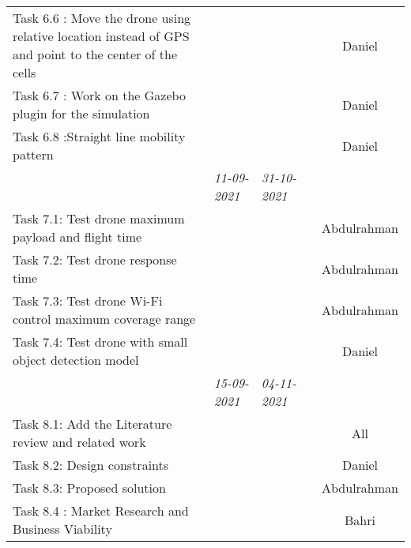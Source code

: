 \begin{center}
\begin{small}
\begin{xltabular}{\textwidth}{ p{3cm} p{5cm} X X c }
            Task 6.6 : Move the drone using relative location instead of GPS and point to the center of the cells
                & & & & Daniel \\

            Task 6.7 : Work on the Gazebo plugin for the simulation
                & & & & Daniel \\

            Task 6.8 :Straight line mobility pattern
                & & & & Daniel \\

            \addlinespace
                & \emph{11-09-2021} & \emph{31-10-2021} & 
            \\ \addlinespace

            Task 7.1: Test drone maximum payload and flight time 
                & & & & Abdulrahman \\

            Task 7.2: Test drone response time
                & & & & Abdulrahman \\

            Task 7.3: Test drone Wi-Fi control maximum coverage range
                & & & & Abdulrahman \\

            Task 7.4: Test drone with small object detection model 
                & & & & Daniel \\

            \addlinespace
                & \emph{15-09-2021} & \emph{04-11-2021} & 
            \\ \addlinespace

            Task 8.1: Add the Literature review and related work
                & & & & All \\

            Task 8.2: Design constraints 
                & & & & Daniel \\

            Task 8.3: Proposed solution 
                & & & & Abdulrahman \\

            Task 8.4 : Market Research and Business Viability
                & & & & Bahri \\


\end{xltabular}
\end{small}
\end{center}
